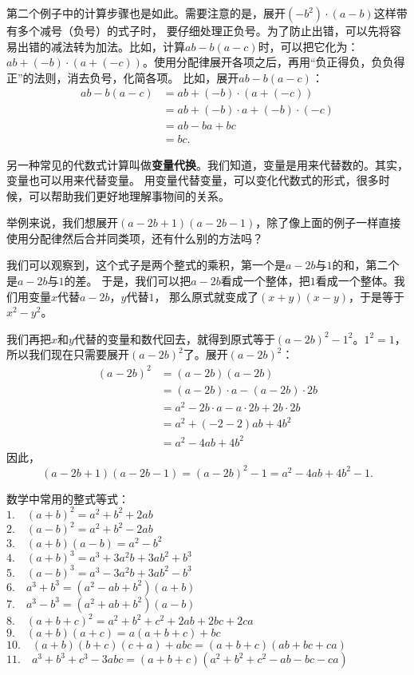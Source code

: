 \documentclass[12pt,UTF8]{ctexbook}
\theoremstyle{definition}
\theoremstyle{plain}
\begin{document}
第二个例子中的计算步骤也是如此。需要注意的是，展开$(- b^2)\cdot (a - b)$这样带有多个减号（负号）的式子时，
要仔细处理正负号。为了防止出错，可以先将容易出错的减法转为加法。比如，计算$ab - b(a-c)$时，可以把它化为：
$ab+(-b)\cdot(a + (-c))$。使用分配律展开各项之后，再用“负正得负，负负得正”的法则，消去负号，化简各项。
比如，展开$ab - b(a-c)$：
\begin{align*}
    ab - b(a-c) &= ab+(-b)\cdot(a + (-c)) \tag{减法化加法}\\
    &= ab + (-b)\cdot a + (-b) \cdot (-c) \tag{分配律展开} \\
    &= ab - ba + bc \tag{消去负号}\\
    &= bc.
\end{align*}

另一种常见的代数式计算叫做\textbf{变量代换}。我们知道，变量是用来代替数的。其实，变量也可以用来代替变量。
用变量代替变量，可以变化代数式的形式，很多时候，可以帮助我们更好地理解事物间的关系。

举例来说，我们想展开$(a - 2b + 1)(a - 2b - 1)$，除了像上面的例子一样直接使用分配律然后合并同类项，还有什么别的方法吗？

我们可以观察到，这个式子是两个整式的乘积，第一个是$a - 2b$与$1$的和，第二个是$a - 2b$与$1$的差。
于是，我们可以把$a - 2b$看成一个整体，把$1$看成一个整体。我们用变量$x$代替$a - 2b$，$y$代替$1$，
那么原式就变成了$(x + y)(x - y)$，于是等于$x^2 - y^2$。

我们再把$x$和$y$代替的变量和数代回去，就得到原式等于$(a - 2b)^2 - 1^2$。$1^2 = 1$，
所以我们现在只需要展开$(a - 2b)^2$了。展开$(a - 2b)^2$：
\begin{align*}
    (a - 2b)^2 &= (a - 2b)(a - 2b)  \\
    &= (a - 2b)\cdot a - (a - 2b) \cdot 2b  \\
    &= a^2 -2b\cdot a -a\cdot 2b + 2b\cdot 2b  \\
    &= a^2 + (-2 -2) ab + 4b^2  \\
    &= a^2 - 4ab + 4b^2 
\end{align*}
因此，
$$ (a - 2b + 1)(a - 2b - 1) = (a - 2b)^2 - 1 = a^2 - 4ab + 4b^2 - 1.$$

数学中常用的整式等式：\\
\indent $1. \quad (a + b)^2 = a^2 + b^2 + 2ab $ \\
\indent $2. \quad (a - b)^2 = a^2 + b^2 - 2ab $ \\
\indent $3. \quad (a + b)(a - b) = a^2 - b^2 $ \\
\indent $4. \quad (a + b)^3 = a^3 + 3a^2b + 3ab^2 + b^3 $ \\
\indent $5. \quad (a - b)^3 = a^3 - 3a^2b + 3ab^2 - b^3 $ \\
\indent $6. \quad a^3 + b^3 = (a^2 - ab + b^2)(a + b) $ \\
\indent $7. \quad a^3 - b^3 = (a^2 + ab + b^2)(a - b) $ \\
\indent $8. \quad (a + b + c)^2 = a^2 + b^2 + c^2 + 2ab + 2bc + 2ca $ \\
\indent $9. \quad (a + b)(a + c) = a(a + b + c) + bc $ \\
\indent $10. \quad (a + b)(b + c)(c + a) + abc = (a + b + c)(ab + bc + ca) $ \\
\indent $11.\quad  a^3+b^3+c^3 - 3abc = (a + b + c)(a^2+b^2+c^2-ab-bc-ca) $ 
\end{document}
